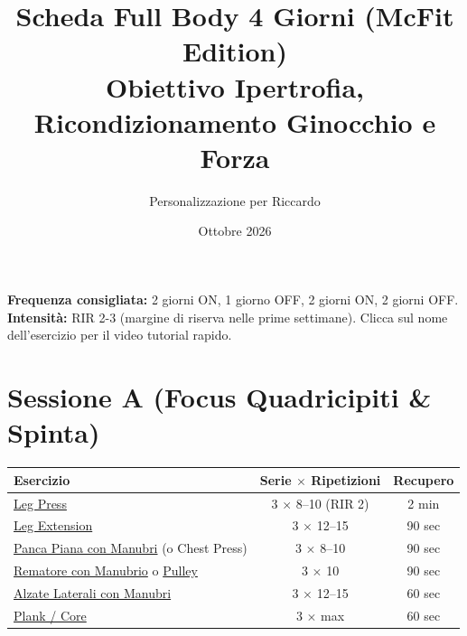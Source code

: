 \documentclass[11pt,a4paper]{article}
\title{\textbf{Scheda Full Body 4 Giorni (McFit Edition)}\\ \large Obiettivo Ipertrofia, Ricondizionamento Ginocchio e Forza}
\author{Personalizzazione per Riccardo}
\date{Ottobre 2026}
\begin{document}
\maketitle

\noindent\textbf{Frequenza consigliata:} 2 giorni ON, 1 giorno OFF, 2 giorni ON, 2 giorni OFF.\\
\textbf{Intensità:} RIR 2-3 (margine di riserva nelle prime settimane). Clicca sul nome dell'esercizio per il video tutorial rapido.

\section*{Sessione A (Focus Quadricipiti \& Spinta)}
\begin{tabular}{>{\raggedright\arraybackslash}p{6.5cm} c c}
\toprule
\textbf{Esercizio} & \textbf{Serie $\times$ Ripetizioni} & \textbf{Recupero} \\
\midrule
\href{https://www.youtube.com/results?search_query=leg+press+tutorial+short}{Leg Press} & 3 $\times$ 8--10 (RIR 2) & 2 min \\
\href{https://www.youtube.com/results?search_query=leg+extension+tutorial+short}{Leg Extension} & 3 $\times$ 12--15 & 90 sec \\
\href{https://www.youtube.com/results?search_query=dumbbell+bench+press+tutorial+short}{Panca Piana con Manubri} (o Chest Press) & 3 $\times$ 8--10 & 90 sec \\
\href{https://www.youtube.com/results?search_query=single+arm+dumbbell+row+tutorial+short}{Rematore con Manubrio} o \href{https://www.youtube.com/results?search_query=cable+pulley+row+tutorial+short}{Pulley} & 3 $\times$ 10 & 90 sec \\
\href{https://www.youtube.com/results?search_query=dumbbell+lateral+raise+tutorial+short}{Alzate Laterali con Manubri} & 3 $\times$ 12--15 & 60 sec \\
\href{https://www.youtube.com/results?search_query=plank+exercise+tutorial+short}{Plank / Core} & 3 $\times$ max & 60 sec \\
\bottomrule
\end{tabular}
\end{document}
